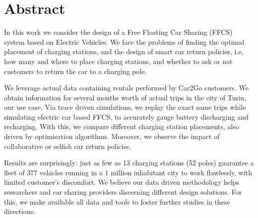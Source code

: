 \section{Abstract}

In this work we consider the design of a Free Floating Car Sharing (FFCS) system based on Electric Vehicles. We face the problems of finding the optimal placement of charging stations, and the design of smart car return policies, i.e, how many and where to place charging stations, and whether to ask or not customers to return the car to a charging pole.

We leverage actual data containing rentals performed by Car2Go customers. We obtain information for several months worth of actual trips in the city of Turin, our use case.
Via trace driven simulations, we replay the exact same trips while simulating electric car based FFCS, to accurately gauge battery discharging and recharging.
With this, we compare different charging station placements, also driven by optimisation algorithms. Moreover, we observe the impact of collaborative or selfish car return policies.

Results are surprisingly: just as few as 13 charging stations (52 poles) guarantee a fleet of 377 vehicles running in a 1 million inhabitant city to work flawlessly, with limited customer's discomfort.
We believe our data driven methodology helps researchers and car sharing providers discerning different design solutions. For this, we make available all data and tools to foster further studies in these directions.
